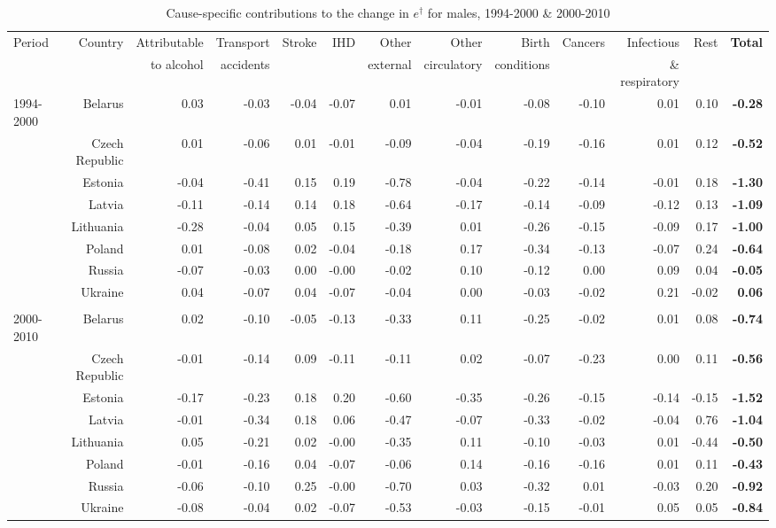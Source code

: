 \documentclass{article}
\begin{document}
\begin{landscape}
\begin{table}

\centering
\caption{Cause-specific contributions to the change in $e^\dagger$ for males, 1994-2000 \& 2000-2010}
\label{T2}
\begin{tabular}{l|rrrrrrrrrrr>{\bfseries}r}
  \hline
Period & Country & Attributable & Transport & Stroke & IHD & Other & Other & Birth & Cancers & Infectious & Rest & Total \\ 
 & & to alcohol & accidents &  &  & external & circulatory & conditions &  & \& respiratory  &    \\ 
  \hline
  \rowcolor{gray!50}
1994-2000 &
Belarus & 0.03 & -0.03 & -0.04 & -0.07 & 0.01 & -0.01 & -0.08 & -0.10 & 0.01 & 0.10 & -0.28 \\ 
&  Czech Republic & 0.01 & -0.06 & 0.01 & -0.01 & -0.09 & -0.04 & -0.19 & -0.16 & 0.01 & 0.12 & -0.52 \\ 
&  Estonia & -0.04 & -0.41 & 0.15 & 0.19 & -0.78 & -0.04 & -0.22 & -0.14 & -0.01 & 0.18 & -1.30 \\ 
&  Latvia & -0.11 & -0.14 & 0.14 & 0.18 & -0.64 & -0.17 & -0.14 & -0.09 & -0.12 & 0.13 & -1.09 \\ 
&  Lithuania & -0.28 & -0.04 & 0.05 & 0.15 & -0.39 & 0.01 & -0.26 & -0.15 & -0.09 & 0.17 & -1.00 \\ 
&  Poland & 0.01 & -0.08 & 0.02 & -0.04 & -0.18 & 0.17 & -0.34 & -0.13 & -0.07 & 0.24 & -0.64 \\ 
&  Russia & -0.07 & -0.03 & 0.00 & -0.00 & -0.02 & 0.10 & -0.12 & 0.00 & 0.09 & 0.04 & -0.05 \\ 
&  Ukraine & 0.04 & -0.07 & 0.04 & -0.07 & -0.04 & 0.00 & -0.03 & -0.02 & 0.21 & -0.02 & 0.06 \\ 
 & & & & & & & & & & \\
    \hline
      \rowcolor{gray!50}
2000-2010 &
  Belarus & 0.02 & -0.10 & -0.05 & -0.13 & -0.33 & 0.11 & -0.25 & -0.02 & 0.01 & 0.08 & -0.74 \\ 
&  Czech Republic & -0.01 & -0.14 & 0.09 & -0.11 & -0.11 & 0.02 & -0.07 & -0.23 & 0.00 & 0.11 & -0.56 \\ 
&  Estonia & -0.17 & -0.23 & 0.18 & 0.20 & -0.60 & -0.35 & -0.26 & -0.15 & -0.14 & -0.15 & -1.52 \\ 
&  Latvia & -0.01 & -0.34 & 0.18 & 0.06 & -0.47 & -0.07 & -0.33 & -0.02 & -0.04 & 0.76 & -1.04 \\ 
&  Lithuania & 0.05 & -0.21 & 0.02 & -0.00 & -0.35 & 0.11 & -0.10 & -0.03 & 0.01 & -0.44 & -0.50 \\ 
 & Poland & -0.01 & -0.16 & 0.04 & -0.07 & -0.06 & 0.14 & -0.16 & -0.16 & 0.01 & 0.11 & -0.43 \\ 
 & Russia & -0.06 & -0.10 & 0.25 & -0.00 & -0.70 & 0.03 & -0.32 & 0.01 & -0.03 & 0.20 & -0.92 \\ 
 & Ukraine & -0.08 & -0.04 & 0.02 & -0.07 & -0.53 & -0.03 & -0.15 & -0.01 & 0.05 & 0.05 & -0.84 \\ 
   \hline
\end{tabular}


\end{table}
\end{landscape}
\end{document}
